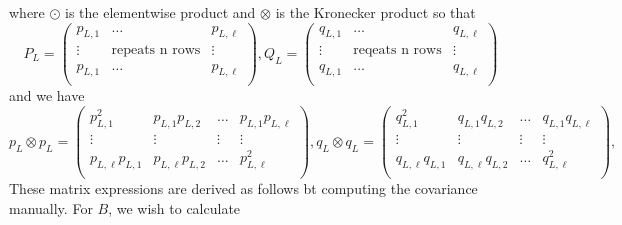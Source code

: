 \documentclass{statsmsc}
\begin{document}
where $\odot$ is the elementwise product and $\otimes$ is the Kronecker product so that 
$$
P_L=\begin{pmatrix}
  p_{L,1}  & \dots & p_{L,\ell}  \\
  \vdots & \text{repeats n rows} &  \vdots\\
  p_{L,1}  & \dots & p_{L,\ell}  \\
\end{pmatrix},
Q_L=\begin{pmatrix}
  q_{L,1}  & \dots & q_{L,\ell}  \\
  \vdots & \text{reqeats n rows} &  \vdots\\
  q_{L,1}  & \dots & q_{L,\ell}  \\
\end{pmatrix}
$$
and we have 
$$
p_L\otimes p_L=\begin{pmatrix}
  p_{L,1}^2 & p_{L,1}p_{L,2} & \dots & p_{L,1}p_{L,\ell} \\
  \vdots & \vdots & \vdots & \vdots \\
  p_{L,\ell}p_{L,1} & p_{L,\ell}p_{L,2} & \dots & p_{L,\ell}^2 \\
\end{pmatrix},
q_L\otimes q_L=\begin{pmatrix}
  q_{L,1}^2 & q_{L,1}q_{L,2} & \dots & q_{L,1}q_{L,\ell} \\
  \vdots & \vdots & \vdots & \vdots \\
  q_{L,\ell}q_{L,1} & q_{L,\ell}q_{L,2} & \dots & q_{L,\ell}^2 \\
\end{pmatrix},
$$ 
These matrix expressions are derived as follows bt computing the covariance manually. 
For $B$, we wish to calculate 
\end{document}
